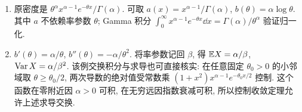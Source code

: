 \begin{solution}
\begin{enumerate}[label=\arabic*.]
\begin{enumerate}[label=\alph*)]
\item 原密度是 $\theta^\alpha x^{\alpha-1}e^{-\theta x}/\Gamma(\alpha)$. 可取 $a(x)=x^{\alpha-1}/\Gamma(\alpha)$, $b(\theta)=\alpha\log\theta$. 其中 $a$ 不依赖率参数 $\theta$; Gamma 积分 $\int_0^\infty x^{\alpha-1}e^{-\theta x}\dd x=\Gamma(\alpha)/\theta^\alpha$ 验证归一化.
\item $b'(\theta)=\alpha/\theta$, $b''(\theta)=-\alpha/\theta^2$. 将率参数记回 $\beta$, 得 $\mathbb E X=\alpha/\beta$, $\operatorname{Var} X=\alpha/\beta^2$. 该例交换积分与求导也可直接核实: 在任意固定 $\theta_0>0$ 的小邻域取 $\theta\ge\theta_0/2$, 两次导数的绝对值受常数乘 $(1+x^2)x^{\alpha-1}e^{-\theta_0x/2}$ 控制. 这个函数在零附近因 $\alpha>0$ 可积, 在无穷远因指数衰减可积, 所以控制收敛定理允许上述求导交换.
\end{enumerate}
\end{enumerate}
\end{solution}


